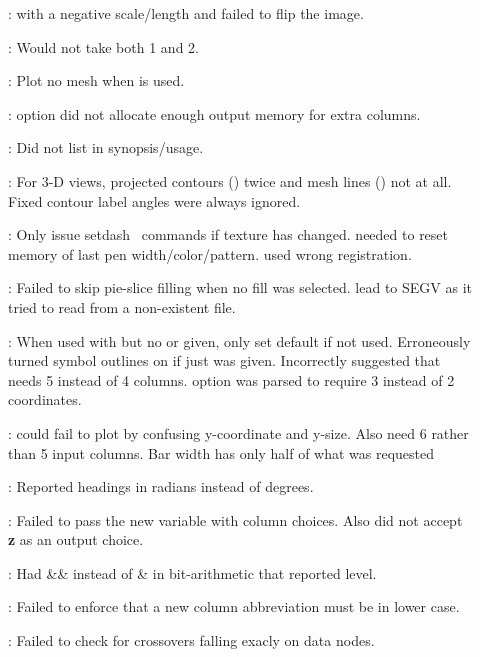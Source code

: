 \begin{description}
\item []:  with a negative scale/length and  failed to flip the image.
\item []: Would not take both 1 and 2.
\item []: Plot no mesh when  is used.
\item []:  option did not allocate enough output memory for extra columns.
\item []: Did not list  in synopsis/usage.
\item []: For 3-D views,  projected contours () twice and mesh lines () not at all.
Fixed contour label angles were always ignored.
\item []: Only issue setdash \PS\ commands if texture has changed.   needed to
reset memory of last pen width/color/pattern.   used wrong registration.
\item []: Failed to skip pie-slice filling when no fill was selected.   lead to
SEGV as it tried to read from a non-existent file.
\item []: When used with  but no  or  given, only set default  if  not used.
Erroneously turned symbol outlines on if just  was given.  Incorrectly suggested that  needs 5 instead of 4 columns.
 option was parsed to require 3 instead of 2 coordinates.
\item []:  could fail to plot by confusing y-coordinate and y-size.
Also need 6 rather than 5 input columns.  Bar width has only half of what was requested
\item []: Reported headings in radians instead of degrees.
\item []: Failed to pass the new variable with column choices.
Also did not accept { \bf z} as an output choice.
\item []: Had \&\& instead of \& in bit-arithmetic that reported level.
\item []: Failed to enforce that a new column abbreviation must be in lower case.
\item []: Failed to check for crossovers falling exacly on data nodes.
\end{description}

